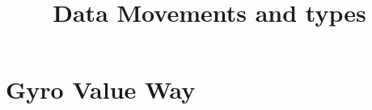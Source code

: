 \documentclass[11pt, a4paper]{article}
\begin{document}
\title{Data Movements and types}
\maketitle

\thispagestyle{empty}


\tableofcontents

\newpage

\section{Gyro Value Way}
\end{document}
